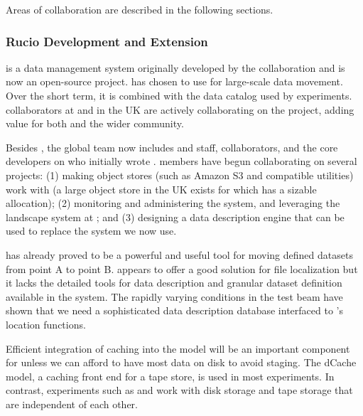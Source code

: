 Areas of collaboration are described in the following sections. 

\subsubsection{Rucio Development and Extension}

 \cite{Barisits:2019fyl}
is a data management system originally developed by the  collaboration and is now an open-source project.   has chosen to use  for large-scale data movement.  Over the short term, it is combined with the  data catalog used by  experiments.   collaborators at  and in the UK are actively collaborating on the  project, adding value for both  and the wider community. %


Besides , the global  team now includes  and  staff,  collaborators, and the core developers on  who initially wrote .    members have begun collaborating on several projects:  (1) making object stores (such as Amazon S3 and compatible utilities) work with  (a large object store in the UK exists for which  has a sizable allocation);  (2) monitoring  and administering the  system, and leveraging the landscape system at ; and  (3) designing a  data description engine that can be used to replace the  system we now use.



 has already proved to be a powerful and useful tool for moving defined datasets from point A to point B.  %
 appears to offer a good solution for file localization but it lacks %
the detailed tools for data description and granular dataset definition available in the %
 system.  The rapidly varying conditions in the test beam have shown that we need a sophisticated data description database interfaced to 's location functions. 

Efficient integration of caching into the  model will be an important component for  unless we can afford to have most data on disk to avoid staging.  The dCache model, a caching front end for a tape store, is used in most  experiments. In contrast,  experiments such as  and  work with disk storage and tape storage that are independent of each other.    


